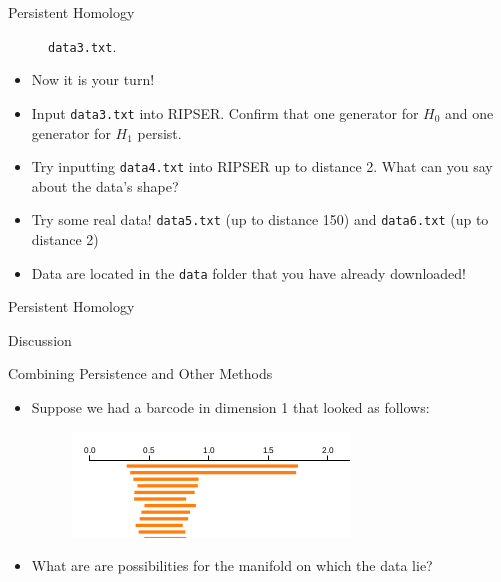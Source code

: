 \begin{frame}{Persistent Homology}
\begin{center}
\begin{figure}
\caption{\texttt{data3.txt}.}
\end{figure}
\end{center}
\begin{itemize}
\item Now it is your turn!
\item Input \texttt{data3.txt} into RIPSER. Confirm that one generator for $H_0$ and one generator for $H_1$ persist.
\item Try inputting \texttt{data4.txt} into RIPSER up to distance 2. What can you say about the data's shape?
\item Try some real data! \texttt{data5.txt} (up to distance 150) and \texttt{data6.txt} (up to distance 2)
\item Data are located in the \texttt{data} folder that you have already downloaded!
\end{itemize}
\end{frame}
\begin{frame}{Persistent Homology}
\begin{center}
{\Huge Discussion}
\end{center}
\end{frame}
\begin{frame}{Combining Persistence and Other Methods}
\begin{itemize}
\item Suppose we had a barcode in dimension 1 that looked as follows:
\begin{figure}
\includegraphics[scale=0.5]{images/torusbar.png}
\end{figure}
\item What are are possibilities for the manifold on which the data lie?
\end{itemize}
\end{frame}
